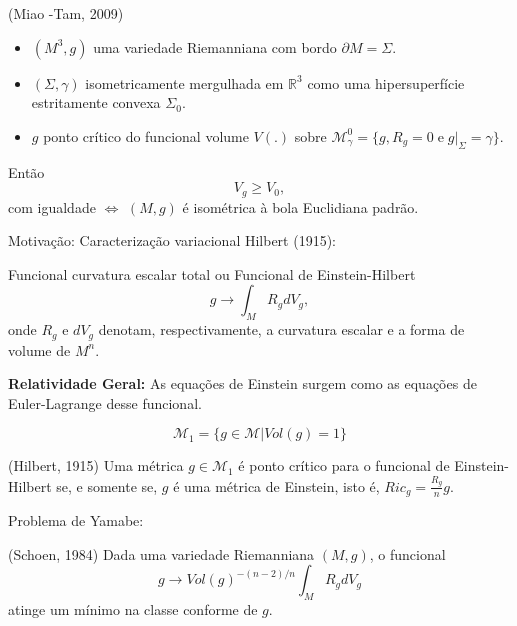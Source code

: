 \documentclass[blue]{beamer}
\begin{document}
\begin{frame}{(Miao -Tam, 2009)}\pause
\begin{itemize}
\item$(M^3, g)$ uma variedade Riemanniana com bordo $\partial M = \Sigma$.\pause
\item $(\Sigma, \gamma)$ isometricamente mergulhada em $\mathbb{R}^{3}$ como uma hipersuperfície estritamente convexa $\Sigma_{0}$.\pause
\item $g$ ponto crítico do funcional volume $V(.)$ sobre $\mathcal{M}_{\gamma}^{0} = \{g, R_{g} = 0 \; \mbox{e} \; g|_{\Sigma}= \gamma\}$.\pause
\end{itemize}

Então
$$V_{g}\geq V_{0},$$
com igualdade $\Leftrightarrow$ $(M, g)$ é isométrica à bola Euclidiana padrão.

\end{frame}




\begin{frame}{Motivação: Caracterização variacional}\pause
Hilbert (1915): \pause
\begin{block}{Funcional curvatura escalar total ou Funcional de Einstein-Hilbert}
$$g \rightarrow \int_{M}R_{g} dV_{g},$$
onde $R_{g}$ e $dV_{g}$ denotam, respectivamente, a curvatura escalar e a forma de volume de  $M^n$.
\end{block}\pause

\vspace{0.2cm}
{\bf Relatividade Geral:} As equações de Einstein surgem como as equações de Euler-Lagrange desse funcional.
\end{frame}









\begin{frame}
$$\mathcal{M}_{1}=\{g\in \mathcal{M} | Vol(g)=1\}$$\pause
\begin{block}{(Hilbert, 1915)}
Uma métrica $g\in\mathcal{M}_{1}$ é ponto crítico para o funcional de Einstein-Hilbert se, e somente se, $g$ é uma métrica de Einstein, isto é, $Ric_{g}=\frac{R_{g}}{n}g$.
\end{block}\pause

\vspace{0.2cm}
Problema de Yamabe:\pause
\begin{block}{(Schoen, 1984)}
Dada uma variedade Riemanniana $(M,g)$, o funcional $$g \rightarrow Vol(g)^{-(n-2)/n}\int_{M}R_{g} dV_{g}$$ atinge um mínimo na classe conforme de $g$.
\end{block}
\end{frame}
\end{document}
